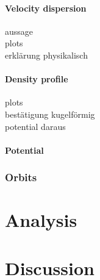 \documentclass[a4paper,12pt,abstracton]{scrartcl}
\begin{document}
\subsection{Velocity dispersion}
aussage\\
plots\\
erklärung physikalisch
\subsection{Density profile}
plots\\
bestätigung kugelförmig\\
potential daraus
\subsection{Potential}
\section{Orbits}

\newpage
\part{Analysis}
\newpage
\part{Discussion}
\end{document}

